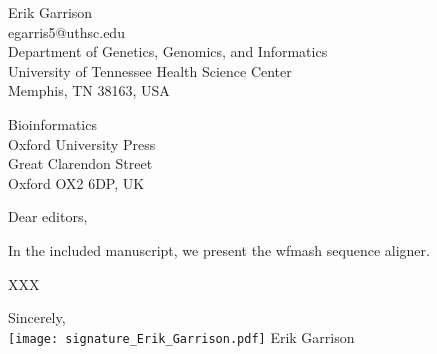 \documentclass[12pt,hidelinks,letterpaper]{article}
\begin{document}
\begin{flushright}
  Erik Garrison \\
  egarris5@uthsc.edu \\
  Department of Genetics, Genomics, and Informatics \\
  University of Tennessee Health Science Center \\
  Memphis, TN 38163, USA
\end{flushright}


\begin{flushleft}
  Bioinformatics \\
  Oxford University Press \\
  Great Clarendon Street \\
  Oxford OX2 6DP, UK
\end{flushleft}


Dear editors,
\hfill \break

In the included manuscript, we present the wfmash sequence aligner.

XXX


\hfill \break

\indent Sincerely,\\
\texttt{[image: signature\_Erik\_Garrison.pdf]}
\hfill \break
\indent Erik Garrison



\begin{comment}
\hfill \break
\begingroup
\let\oldthebibliography\thebibliography
\let\endoldthebibliography\endthebibliography
\renewenvironment{thebibliography}[1]{
  \begin{oldthebibliography}{#1}
    \setlength{\itemsep}{0em}
    \setlength{\parskip}{0em}
}
{
  \end{oldthebibliography}
}
\renewcommand{\section}[2]{}%

{\small }
\endgroup
\end{comment}
\end{document}
